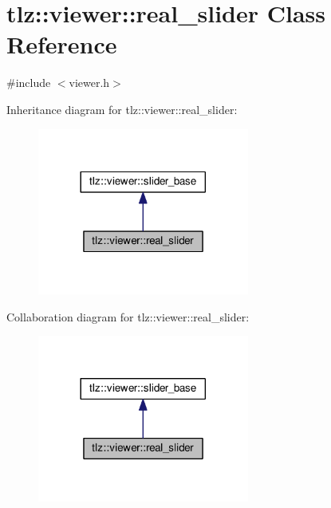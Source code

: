 \hypertarget{classtlz_1_1viewer_1_1real__slider}{}\section{tlz\+:\+:viewer\+:\+:real\+\_\+slider Class Reference}
\label{classtlz_1_1viewer_1_1real__slider}


{\ttfamily \#include $<$viewer.\+h$>$}



Inheritance diagram for tlz\+:\+:viewer\+:\+:real\+\_\+slider\+:
\nopagebreak
\begin{figure}[H]
\begin{center}
\leavevmode
\includegraphics[width=197pt]{classtlz_1_1viewer_1_1real__slider__inherit__graph}
\end{center}
\end{figure}


Collaboration diagram for tlz\+:\+:viewer\+:\+:real\+\_\+slider\+:
\nopagebreak
\begin{figure}[H]
\begin{center}
\leavevmode
\includegraphics[width=197pt]{classtlz_1_1viewer_1_1real__slider__coll__graph}
\end{center}
\end{figure}
